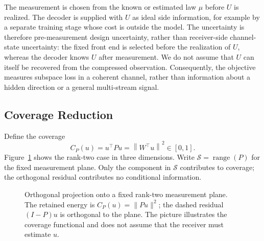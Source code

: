 \documentclass[lettersize,onecolumn]{IEEEtran}
\theoremstyle{remark}
\theoremstyle{definition}
\newcommand{\norm}[1]{\left\lVert #1\right\rVert}
\begin{document}
The measurement is chosen from the known or estimated law $\mu$ before $U$ is realized. The decoder is supplied with $U$ as ideal side information, for example by a separate training stage whose cost is outside the model. The uncertainty is therefore pre-measurement design uncertainty, rather than receiver-side channel-state uncertainty: the fixed front end is selected before the realization of $U$, whereas the decoder knows $U$ after measurement. We do not assume that $U$ can itself be recovered from the compressed observation. Consequently, the objective measures subspace loss in a coherent channel, rather than information about a hidden direction or a general multi-stream signal.

\subsection{Coverage Reduction}
Define the coverage
\begin{equation}
C_P(u)=u^{\top}Pu=\norm{W^{\top}u}^2\in[0,1].
\label{eq:coverage}
\end{equation}
Figure~\ref{fig:projection_geometry} shows the rank-two case in three
dimensions. Write $\mathcal S=\operatorname{range}(P)$ for the fixed
measurement plane. Only the component in $\mathcal S$ contributes to
coverage; the orthogonal residual contributes no conditional information.
\begin{figure}[H]
\centering
{}
\caption{Orthogonal projection onto a fixed rank-two measurement plane.
The retained energy is $C_P(u)=\|Pu\|^2$; the dashed residual
$(I-P)u$ is orthogonal to the plane. The picture illustrates the coverage
functional and does not assume that the receiver must estimate $u$.}
\label{fig:projection_geometry}
\end{figure}
\end{document}
